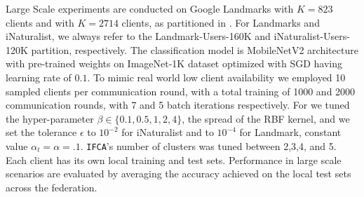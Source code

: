 Large Scale experiments are conducted on Google Landmarks \citep{weyand2020google} with $K = 823$ clients and \citep{van2018inaturalist} with $K = 2714$ clients, as partitioned in \citep{hsu2020federated}. For Landmarks and iNaturalist, we always refer to the Landmark-Users-160K and iNaturalist-Users-120K partition, respectively. The classification model is MobileNetV2 architecture \citep{sandler2018mobilenetv2} with pre-trained weights on ImageNet-1K dataset \citep{deng2009imagenet} optimized with SGD having learning rate of $0.1$. To mimic real world low client availability we employed 10 sampled clients per communication round, with a total training of 1000 and 2000 communication rounds, with 7 and 5 batch iterations respectively. For \shortname we tuned the hyper-parameter $\beta \in \{0.1, 0.5, 1, 2, 4\}$, \ie the spread of the RBF kernel, and we set the tolerance $\epsilon$ to $10^{-2}$ for iNaturalist and to $10^{-4}$ for Landmark, constant value $\alpha_t = \alpha = .1$. \texttt{IFCA}'s number of clusters was tuned between 2,3,4, and 5. Each client has its own local training and test sets. Performance in large scale scenarios are evaluated by averaging the accuracy achieved on the local test sets across the federation.
